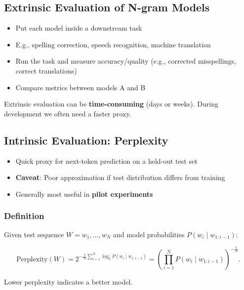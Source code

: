 \documentclass[11pt,a4paper]{article}
\theoremstyle{definition}
\theoremstyle{plain}
\theoremstyle{remark}
\begin{document}
\subsection{Extrinsic Evaluation of N-gram Models}

\begin{itemize}
    \item Put each model inside a downstream task
    \item E.g., spelling correction, speech recognition, machine translation
    \item Run the task and measure accuracy/quality (e.g., corrected misspellings, correct translations)
    \item Compare metrics between models A and B
\end{itemize}

\begin{tcolorbox}[colback=orange!5!white,colframe=orange!75!black,title=\textbf{Difficulty of Extrinsic (in-vivo) Evaluation}]
Extrinsic evaluation can be \textbf{time-consuming} (days or weeks). During development we often need a faster proxy.
\end{tcolorbox}

\subsection{Intrinsic Evaluation: Perplexity}

\begin{itemize}
    \item Quick proxy for next-token prediction on a held-out test set
    \item \textbf{Caveat}: Poor approximation if test distribution differs from training
    \item Generally most useful in \textbf{pilot experiments}
\end{itemize}

\subsubsection{Definition}

Given test sequence $W=w_1,\ldots,w_N$ and model probabilities $P(w_i\mid w_{1:i-1})$:

\[
\text{Perplexity}(W) = 2^{-\tfrac{1}{N}\sum_{i=1}^{N} \log_2 P(w_i \mid w_{1:i-1})} = \left(\prod_{i=1}^{N} P(w_i \mid w_{1:i-1})\right)^{-\tfrac{1}{N}}.
\]

Lower perplexity indicates a better model.
\end{document}
